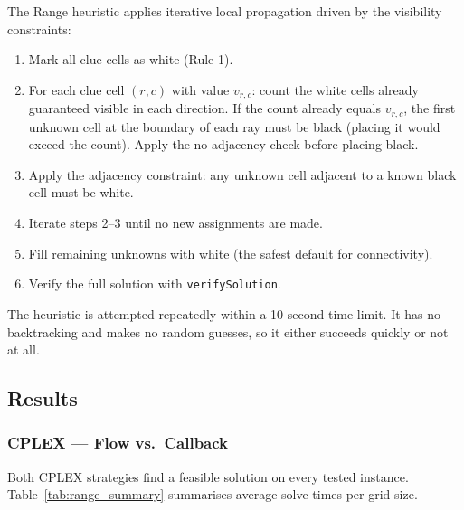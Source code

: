 The Range heuristic applies iterative local propagation driven by the visibility constraints:

\begin{enumerate}
  \item Mark all clue cells as white (Rule 1).
  \item For each clue cell $(r,c)$ with value $v_{r,c}$: count the white cells already guaranteed visible in each direction. If the count already equals $v_{r,c}$, the first unknown cell at the boundary of each ray must be black (placing it would exceed the count). Apply the no-adjacency check before placing black.
  \item Apply the adjacency constraint: any unknown cell adjacent to a known black cell must be white.
  \item Iterate steps 2–3 until no new assignments are made.
  \item Fill remaining unknowns with white (the safest default for connectivity).
  \item Verify the full solution with \texttt{verifySolution}.
\end{enumerate}

The heuristic is attempted repeatedly within a 10-second time limit. It has no backtracking and makes no random guesses, so it either succeeds quickly or not at all.

\subsection{Results}

\subsubsection{CPLEX — Flow vs.\ Callback}

Both CPLEX strategies find a feasible solution on every tested instance. Table~\ref{tab:range_summary} summarises average solve times per grid size.

